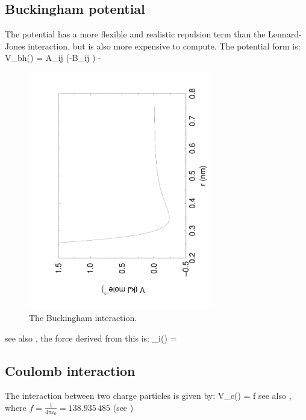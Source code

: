 \subsection{Buckingham potential}
The  
potential has a more flexible and realistic repulsion term
than the Lennard-Jones interaction, but is also more expensive to
compute. The potential form is:
\beq
V_{bh}(\rij) = A_{ij} \exp(-B_{ij} \rij) -
\eeq
\begin{figure}
\centerline{\includegraphics[angle=270,width=8cm]{plots/f_bham}}
\caption {The Buckingham interaction.}
\label{fig:bham}
\end{figure}

see also , the force derived from this is:
\beq
 _i(\rij) =  \rnorm
\eeq

\subsection{Coulomb interaction}
\label{sec:coul}
\newcommand{\epsr}{\varepsilon_r}
\newcommand{\epsrf}{\varepsilon_{rf}}
The  interaction between two charge particles is given by:
\beq
V_c(\rij) = f \frac{q_i q_j}{\epsr \rij}
\label{eqn:vcoul}
\eeq
see also , where $f = \frac{1}{4\pi \varepsilon_0} =
138.935\,485$ (see )

